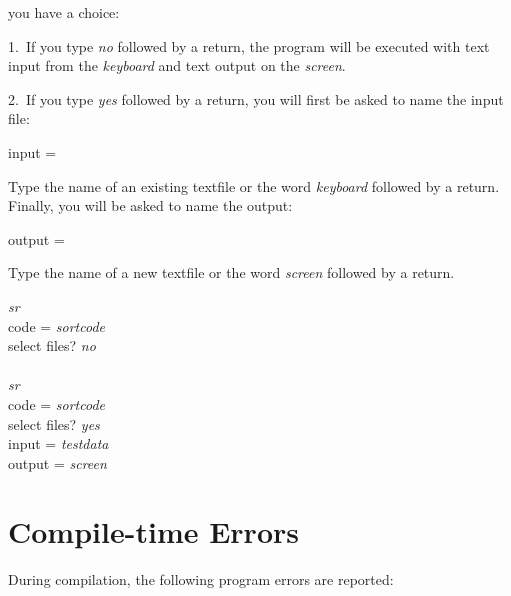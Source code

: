 \noindent
you have a choice:

\blankline

1.~If you type {\it no} followed by a return, the program
will be executed with text input from the {\it keyboard}
and text output on the {\it screen}.

\blankline

2.~If you type {\it yes} followed by a return, you will
first be asked to name the input file:

\begin{center}
  input =
\end{center}

\noindent
Type the name of an existing textfile or the word {\it
keyboard} followed by a return. Finally, you will be asked
to name the output:

\begin{center}
  output =
\end{center}

\noindent
Type the name of a new textfile or the word {\it screen}
followed by a return.

\blankline

\examples

\begin{program}{8.1em}
  {\PA}{\it sr}                 \\
    {\PB}code = {\it sortcode}  \\
    {\PB}select files? {\it no} \\
  {\PA}                         \\
  {\PA}{\it sr}                 \\
    {\PB}code = {\it sortcode}  \\
    {\PB}select files? {\it yes}\\
    {\PB}input = {\it testdata} \\
    {\PB}output = {\it screen}  \\
\end{program}


\section{Compile-time Errors}

During compilation, the following program errors are
reported:

